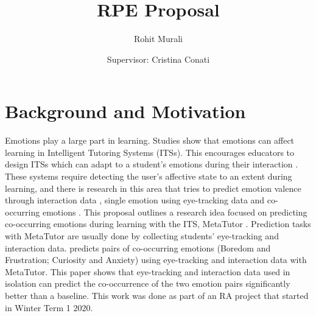 \documentclass[11pt,letterpaper]{article}
\title{\huge \textbf{RPE Proposal}}
\date{}
\author{Rohit Murali \and Supervisor: Cristina Conati}
\begin{document}
\maketitle

\section{Background and Motivation}

Emotions play a large part in learning. Studies  \autocite{baker2010better, wortha2019multiple} show that emotions can affect learning in Intelligent Tutoring Systems (ITSs). This encourages educators to design ITSs which can adapt to a student's emotions during their interaction \autocite{woolf2009affect, grawemeyer2016affecting}. These systems require detecting the user's affective state to an extent during learning, and there is research in this area that tries to predict emotion valence through interaction data \autocite{lalle2018prediction}, single emotion using eye-tracking data \autocite{jaques2014predicting,sims2020neural} and co-occurring emotions \autocite{lalle2021predict}. This proposal outlines a research idea focused on predicting co-occurring emotions during learning with the ITS, MetaTutor \autocite{azevedo2013using}. Prediction tasks with MetaTutor are usually done by collecting students' eye-tracking and interaction data. \autocite{lalle2021predict} predicts pairs of co-occurring emotions (Boredom and Frustration; Curiosity and Anxiety) using eye-tracking and interaction data with MetaTutor. This paper shows that eye-tracking and interaction data used in isolation can predict the co-occurrence of the two emotion pairs significantly better than a baseline. This work was done as part of an RA project that started in Winter Term 1 2020.
\end{document}
